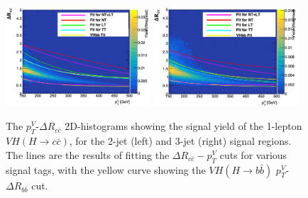 \begin{figure}[h!]
\center
\includegraphics[width=0.48\textwidth]{Images/VH/dRccpTV/sr1.png}
\includegraphics[width=0.48\textwidth]{Images/VH/dRccpTV/sr2.png}
\caption{The $p_T^V$-$\Delta R_{c\bar{c}}$ 2D-histograms showing the signal yield of the 1-lepton $VH(H\rightarrow c\bar{c})$, for the 2-jet (left) and 3-jet (right) signal regions. The lines are the results of fitting the $\Delta R_{c\bar{c}}-p_T^V$ cuts for various signal tags, with the yellow curve showing the $VH(H\rightarrow b\bar{b})$ $p_T^V$-$\Delta R_{b\bar{b}}$ cut.} 
\label{fig:drccptvCutsVHcc}
\end{figure}